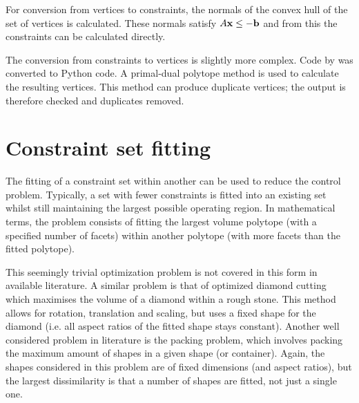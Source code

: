 For conversion from vertices to constraints, the normals of the convex hull of the set of vertices is calculated.
These normals satisfy $A{\bf {x}} \leq -{\bf {b}}$ \citep{qhulldocs} and from this the constraints can be calculated directly.

The conversion from constraints to vertices is slightly more complex.
Code by \citet{con2vert} was converted to Python code.
A primal-dual polytope method is used to calculate the resulting vertices.
This method can produce duplicate vertices; the output is therefore checked and duplicates removed.

\section{Constraint set fitting}\label{sec:confit}
The fitting of a constraint set within another can be used to reduce the control problem.
Typically, a set with fewer constraints is fitted into an existing set whilst still maintaining the largest possible operating region.
In mathematical terms, the problem consists of fitting the largest volume polytope (with a specified number of facets) within another polytope (with more facets than the fitted polytope).

This seemingly trivial optimization problem is not covered in this form in available literature.
A similar problem is that of optimized diamond cutting \citep{diamondcut} which maximises the volume of a diamond within a rough stone.
This method allows for rotation, translation and scaling, but uses a fixed shape for the diamond (i.e. all aspect ratios of the fitted shape stays constant).
Another well considered problem in literature is the packing problem, which involves packing the maximum amount of shapes in a given shape (or container).
Again, the shapes considered in this problem are of fixed dimensions (and aspect ratios), but the largest dissimilarity is that a number of shapes are fitted, not just a single one.

